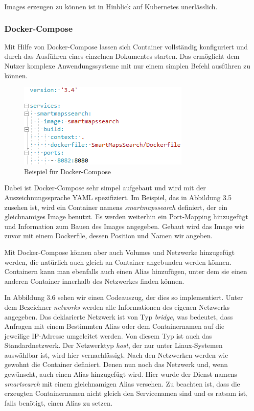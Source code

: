\documentclass[12pt,a4paper]{scrartcl}
\begin{document}
Images erzeugen zu können ist in Hinblick auf Kubernetes unerlässlich.

\subsubsection{Docker-Compose}

Mit Hilfe von Docker-Compose lassen sich Container vollständig konfiguriert und durch das Ausführen eines einzelnen Dokumentes starten. Das ermöglicht dem Nutzer komplexe Anwendungssysteme mit nur einem simplen Befehl ausführen zu können. 

\begin{figure}[h!]
	\centering
	\includegraphics[scale=1]{DockerComposeMin.png}
	\caption[Screenshot]{Beispiel für Docker-Compose}
\end{figure}

Dabei ist Docker-Compose sehr simpel aufgebaut und wird mit der Auszeichnungssprache YAML spezifiziert. Im Beispiel, das in Abbildung 3.5 zusehen ist, wird ein Container namens \emph{smartmapssearch} definiert, der ein gleichnamiges Image benutzt. Es werden weiterhin ein Port-Mapping hinzugefügt und Information zum Bauen des Images angegeben. Gebaut wird das Image wie zuvor mit einem Dockerfile, dessen Position und Namen wir angeben. 

Mit Docker-Compose können aber auch Volumes und Netzwerke hinzugefügt werden, die natürlich auch gleich an Container angebunden werden können.
Containern kann man ebenfalls auch einen Alias hinzufügen, unter dem sie einen anderen Container innerhalb des Netzwerkes finden können. 

In Abbildung 3.6 sehen wir einen Codeauszug, der dies so implementiert. Unter dem Bezeichner \emph{networks} werden alle Informationen des eigenen Netzwerks angegeben. Das deklarierte Netzwerk ist von Typ \emph{bridge}, was bedeutet, dass Anfragen mit einem Bestimmten Alias oder dem Containernamen auf die jeweilige IP-Adresse umgeleitet werden. Von diesem Typ ist auch das Standardnetzwerk. Der Netzwerktyp \emph{host}, der nur unter Linux-Systemen auswählbar ist, wird hier vernachlässigt. Nach den Netzwerken werden wie gewohnt die Container definiert. Denen nun noch das Netzwerk und, wenn gewünscht, auch einen Alias hinzugefügt wird. Hier wurde der Dienst namens \emph{smartsearch} mit einem gleichnamigen Alias versehen. Zu beachten ist, dass die erzeugten Containernamen nicht gleich den Servicenamen sind und es ratsam ist, falls benötigt, einen Alias zu setzen.
\end{document}
